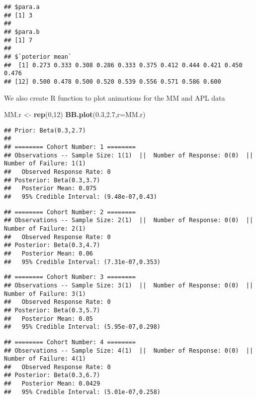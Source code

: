 \documentclass[]{article}
\newenvironment{Shaded}{\begin{snugshade}}{\end{snugshade}}
\newcommand{\KeywordTok}[1]{\textcolor[rgb]{0.13,0.29,0.53}{\textbf{{#1}}}}
\newcommand{\DataTypeTok}[1]{\textcolor[rgb]{0.13,0.29,0.53}{{#1}}}
\newcommand{\DecValTok}[1]{\textcolor[rgb]{0.00,0.00,0.81}{{#1}}}
\newcommand{\FloatTok}[1]{\textcolor[rgb]{0.00,0.00,0.81}{{#1}}}
\newcommand{\StringTok}[1]{\textcolor[rgb]{0.31,0.60,0.02}{{#1}}}
\newcommand{\NormalTok}[1]{{#1}}
\begin{document}
\begin{verbatim}
## $para.a
## [1] 3
## 
## $para.b
## [1] 7
## 
## $`poterior mean`
##  [1] 0.273 0.333 0.308 0.286 0.333 0.375 0.412 0.444 0.421 0.450 0.476
## [12] 0.500 0.478 0.500 0.520 0.539 0.556 0.571 0.586 0.600
\end{verbatim}

We also create R function to plot animations for the MM and APL data

\begin{Shaded}
\begin{Highlighting}[]
\NormalTok{MM.r <-}\StringTok{ }\KeywordTok{rep}\NormalTok{(}\DecValTok{0}\NormalTok{,}\DecValTok{12}\NormalTok{)}
\KeywordTok{BB.plot}\NormalTok{(}\FloatTok{0.3}\NormalTok{,}\FloatTok{2.7}\NormalTok{,}\DataTypeTok{r=}\NormalTok{MM.r)}
\end{Highlighting}
\end{Shaded}

\begin{verbatim}
## Prior: Beta(0.3,2.7) 
## 
## ======== Cohort Number: 1 ======== 
## Observations -- Sample Size: 1(1)  ||  Number of Response: 0(0)  ||  Number of Failure: 1(1)
##   Observed Response Rate: 0
## Posterior: Beta(0.3,3.7) 
##   Posterior Mean: 0.075
##   95% Credible Interval: (9.48e-07,0.43)
\end{verbatim}

\begin{verbatim}
## ======== Cohort Number: 2 ======== 
## Observations -- Sample Size: 2(1)  ||  Number of Response: 0(0)  ||  Number of Failure: 2(1)
##   Observed Response Rate: 0
## Posterior: Beta(0.3,4.7) 
##   Posterior Mean: 0.06
##   95% Credible Interval: (7.31e-07,0.353)
\end{verbatim}

\begin{verbatim}
## ======== Cohort Number: 3 ======== 
## Observations -- Sample Size: 3(1)  ||  Number of Response: 0(0)  ||  Number of Failure: 3(1)
##   Observed Response Rate: 0
## Posterior: Beta(0.3,5.7) 
##   Posterior Mean: 0.05
##   95% Credible Interval: (5.95e-07,0.298)
\end{verbatim}

\begin{verbatim}
## ======== Cohort Number: 4 ======== 
## Observations -- Sample Size: 4(1)  ||  Number of Response: 0(0)  ||  Number of Failure: 4(1)
##   Observed Response Rate: 0
## Posterior: Beta(0.3,6.7) 
##   Posterior Mean: 0.0429
##   95% Credible Interval: (5.01e-07,0.258)
\end{verbatim}
\end{document}

